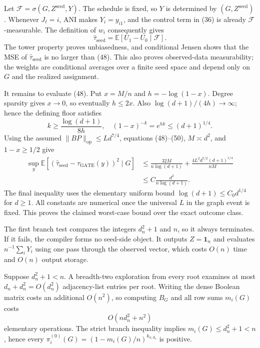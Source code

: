 Let \(\mathcal F=\sigma(G,Z^{\mathrm{seed}},Y)\).  The schedule is fixed,
so \(Y\) is determined by \((G,Z^{\mathrm{seed}})\).  Whenever
\(J_\ell=i\), ANI makes \(Y_i=y_{i1}\), and the control term in (36) is
already \(\mathcal F\)-measurable.  The definition of \(w_i\) consequently
gives
\[
\widehat\tau_{\mathrm{seed}}
=\mathbb E[U_1-U_0\mid\mathcal F].
\tag{49}
\]
The tower property proves unbiasedness, and conditional Jensen shows that
the MSE of \(\widehat\tau_{\mathrm{seed}}\) is no larger than (48).  This
also proves observed-data measurability; the weights are conditional
averages over a finite seed space and depend only on \(G\) and the realized
assignment.

It remains to evaluate (48).  Put \(x=M/n\) and
\(h=-\log(1-x)\).  Degree sparsity gives \(x\to0\), so eventually
\(h\le2x\).  Also
\(\log(d+1)/(4h)\to\infty\); hence the defining floor satisfies
\[
k\ge\frac{\log(d+1)}{8h},\quad
(1-x)^{-k}=e^{hk}\le(d+1)^{1/4}.
\tag{50}
\]
Using the assumed \(\|BP\|_{\mathrm{op}}\le Ld^{7/4}\), equations
(48)--(50), \(M\asymp d^2\), and \(1-x\ge1/2\) give
\[
\begin{aligned}
\sup_y\mathbb E[(\widehat\tau_{\mathrm{seed}}-
\tau_{\mathrm{GATE}}(y))^2\mid G]
&\le \frac{32M}{n\log(d+1)}
+\frac{4L^2d^{7/2}(d+1)^{1/4}}{nM}\\
&\le C\frac{d^2}{n\log(d+1)}.
\end{aligned}
\tag{51}
\]
The final inequality uses the elementary uniform bound
\(\log(d+1)\le C_0d^{1/4}\) for \(d\ge1\).  All constants are numerical
once the universal \(L\) in the graph event is fixed.  This proves the
claimed worst-case bound over the exact outcome class.

The first branch test compares the integers \(d_n^2+1\) and \(n\), so it
always terminates.  If it fails, the compiler forms no seed-side object.
It outputs \(Z=\boldsymbol{1}_n\) and evaluates
\(n^{-1}\sum_iY_i\) using one pass through the observed vector, which costs
\(O(n)\) time and \(O(n)\) output storage.

Suppose \(d_n^2+1<n\).  A breadth-two exploration from every root examines
at most \(d_n+d_n^2=O(d_n^2)\) adjacency-list entries per root.  Writing
the dense Boolean matrix costs an additional \(O(n^2)\), so computing
\(B_G\) and all row sums \(m_i(G)\) costs
\[
O(nd_n^2+n^2)
\tag{52}
\]
elementary operations.  The strict branch inequality implies
\(m_i(G)\le d_n^2+1<n\), hence every
\(\pi_i^{(0)}(G)=(1-m_i(G)/n)^{k_{n,d_n}}\) is positive.

